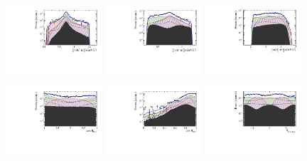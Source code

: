 \begin{figure}[h]
		\includegraphics[width=0.32\textwidth, height = !]{figs/lassoFit/LASSO/m_Kpi_mod_log.pdf} 
		\includegraphics[width=0.32\textwidth, height = !]{figs/lassoFit/LASSO/m_pipi_mod_log.pdf} 
		\includegraphics[width=0.32\textwidth, height = !]{figs/lassoFit/LASSO/m_Dspi_mod_log.pdf} 
		
		\includegraphics[width=0.32\textwidth, height = !]{figs/lassoFit/LASSO/h_cosTheta_Kpi_mod_log.pdf} 
		\includegraphics[width=0.32\textwidth, height = !]{figs/lassoFit/LASSO/h_cosTheta_Dspi_mod_log.pdf} 
		\includegraphics[width=0.32\textwidth, height = !]{figs/lassoFit/LASSO/h_phi_Kpi_Dspi_mod_log.pdf} 

		\caption{} 		
\end{figure}

